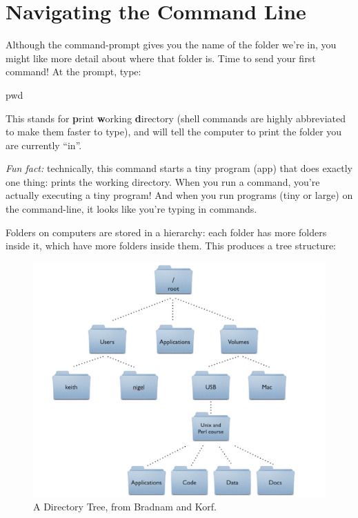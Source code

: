 \documentclass[]{book}
\newenvironment{Shaded}{\begin{snugshade}}{\end{snugshade}}
\newcommand{\BuiltInTok}[1]{#1}
\theoremstyle{definition}
\theoremstyle{definition}
\theoremstyle{remark}
\begin{document}
\section{Navigating the Command Line}\label{navigating-the-command-line}

Although the command-prompt gives you the name of the folder we're in,
you might like more detail about where that folder is. Time to send your
first command! At the prompt, type:

\begin{Shaded}
\begin{Highlighting}[]
\BuiltInTok{pwd}
\end{Highlighting}
\end{Shaded}

This stands for \textbf{p}rint \textbf{w}orking \textbf{d}irectory
(shell commands are highly abbreviated to make them faster to type), and
will tell the computer to print the folder you are currently ``in''.

\emph{Fun fact:} technically, this command starts a tiny program (app)
that does exactly one thing: prints the working directory. When you run
a command, you're actually executing a tiny program! And when you run
programs (tiny or large) on the command-line, it looks like you're
typing in commands.

Folders on computers are stored in a hierarchy: each folder has more
folders inside it, which have more folders inside them. This produces a
tree structure:

\begin{figure}
\centering
\includegraphics{img/command-line/dir-tree.png}
\caption{A Directory Tree, from Bradnam and Korf.}
\end{figure}
\end{document}
